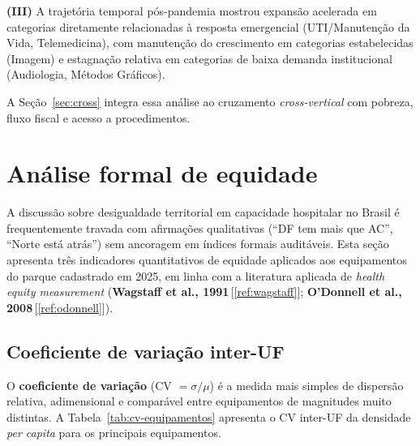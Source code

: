 \documentclass[12pt,a4paper,oneside]{article}
\begin{document}
\textbf{(III)} A trajetória temporal pós-pandemia mostrou expansão
acelerada em categorias diretamente relacionadas à resposta
emergencial (UTI/Manutenção da Vida, Telemedicina), com manutenção
do crescimento em categorias estabelecidas (Imagem) e estagnação
relativa em categorias de baixa demanda institucional (Audiologia,
Métodos Gráficos).

A Seção~\ref{sec:cross} integra essa análise ao cruzamento
\textit{cross-vertical} com pobreza, fluxo fiscal e acesso a
procedimentos.

\section{Análise formal de equidade}\label{sec:equidade}

A discussão sobre desigualdade territorial em capacidade hospitalar
no Brasil é frequentemente travada com afirmações qualitativas
(``DF tem mais que AC'', ``Norte está atrás'') sem ancoragem em
índices formais auditáveis. Esta seção apresenta três indicadores
quantitativos de equidade aplicados aos equipamentos do parque
cadastrado em 2025, em linha com a literatura aplicada de
\textit{health equity measurement}
(\textbf{Wagstaff et al., 1991}\,[\ref{ref:wagstaff}];
\textbf{O'Donnell et al., 2008}\,[\ref{ref:odonnell}]).

\subsection{Coeficiente de variação inter-UF}\label{sub:cv}

O \textbf{coeficiente de variação} (CV $= \sigma / \mu$) é a
medida mais simples de dispersão relativa, adimensional e
comparável entre equipamentos de magnitudes muito distintas. A
Tabela~\ref{tab:cv-equipamentos} apresenta o CV inter-UF da
densidade \textit{per capita} para os principais equipamentos.
\end{document}
